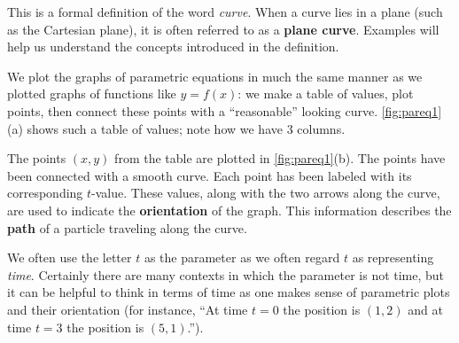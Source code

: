 
This is a formal definition of the word \textit{curve}. When a curve lies in a plane (such as the Cartesian plane), it is often referred to as a \textbf{plane curve}. Examples will help us understand the concepts introduced in the definition.

{We plot the graphs of parametric equations in much the same manner as we plotted graphs of functions like $y=f(x)$: we make a table of values, plot points, then connect these points with a ``reasonable'' looking curve. \autoref{fig:pareq1}(a) shows such a table of values; note how we have 3 columns.

The points $(x,y)$ from the table are plotted in \autoref{fig:pareq1}(b). The points have been connected with a smooth curve. Each point has been labeled with its corresponding $t$-value. These values, along with the two arrows along the curve, are used to indicate the \textbf{orientation} of the graph. This information describes the \textbf{path} of a particle traveling along the curve.}

We often use the letter $t$ as the parameter as we often regard $t$ as representing \textit{time}. Certainly there are many contexts in which the parameter is not time, but it can be helpful to think in terms of time as one makes sense of parametric plots and their orientation (for instance, ``At time $t=0$ the position is $(1,2)$ and at time $t=3$ the position is $(5,1)$.'').

